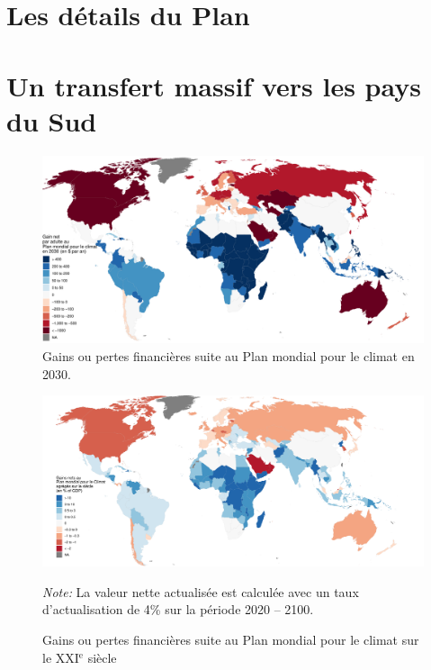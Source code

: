 \documentclass[a5paper,french]{memoir}
\begin{document}


\chapter{Les détails du Plan\label{ch:details}}

\chapter{Un transfert massif vers les pays du Sud\label{ch:effets_distributifs}}


\begin{figure}[h!]
  \caption{Gains ou pertes financières suite au Plan mondial pour le climat en 2030.}\label{fig:median_gain_2015}
  \centerline{\includegraphics[width=.97\paperwidth]{../figures/maps/gain_adj_2030_fr.pdf}} %
\end{figure}

\begin{figure}[b!]
  \caption{Gains ou pertes financières suite au Plan mondial pour le climat sur le XXI$^\text{e}$ siècle}\label{fig:median_gain_adj}
  \centerline{
    \includegraphics[width=\paperwidth]{../figures/maps/npv_over_gdp_gcs_adj_fr.pdf}
    } %
  {\footnotesize \textit{Note:} La valeur nette actualisée est calculée avec un taux d'actualisation de 4\% sur la période 2020 -- 2100.}
\end{figure}
\end{document}

